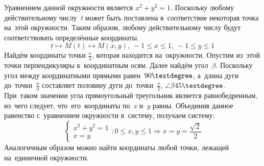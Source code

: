 \documentclass[]{scrartcl}
\begin{document}
%
Уравнением данной окружности является ${\textstyle x^{2} + y^{2} = 1}$. Поскольку любому действительному числу~\textit{t} может быть поставлена в~соответствие некоторая точка на~этой окружности. Таким образом, любому действительному числу будут соответствовать определённые координаты.
\begin{equation}\label{eq:numerci-circle-corrdinates}
t \mapsto M(t) \mapsto M(x,y),\ -1 \leq x \leq 1,\ -1 \leq y \leq 1 
\end{equation}
Найдём координаты точки ${\textstyle \frac{\pi}{4}}$, которая находится на~окружности. Опустим из~этой точки перпендикуляры к~координатным осям. Далее найдём угол~${\textstyle \beta}$. Поскольку угол между координатными прямыми равен~${\textstyle 90\textdegree}$, а~длина дуги до~точки~${\textstyle \frac{\pi}{4}}$ составляет половину дуги до~точки~${\textstyle \frac{\pi}{2}}$, ${\textstyle \angle \beta 45\textdegree}$. При~таком значении угла прямоугольный треугольник является равнобедренным, из~чего следует, что~его~координаты по~\textit{x} и~\textit{y} равны. Объединив данное равенство с~уравнением окружности в~систему, получаем систему:
\begin{equation}\label{eq:numeric-circle-system}
\begin{cases}
x^{2} + y^{2} = 1\\
x=y
\end{cases}
:0 \leq x,y \leq 1 \Rightarrow
x=y = \frac{\sqrt{2}}{2}
\end{equation}
Аналогичным образом можно найти координаты любой точки, лежащей на~единичной окружности. 
\end{document}
